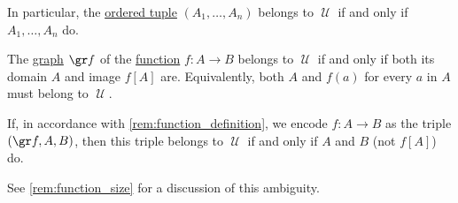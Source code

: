 \begin{proposition}
\begin{thmenum}
    In particular, the \hyperref[def:ordered_tuple]{ordered tuple} \( (A_1, \ldots, A_n) \) belongs to \( \mscrU \) if and only if \( A_1, \ldots, A_n \) do.

     The \hyperref[def:set_valued_function/graph]{graph} \( \gr f \) of the \hyperref[def:function]{function} \( f: A \to B \) belongs to \( \mscrU \) if and only if both its domain \( A \) and image \( f[A] \) are. Equivalently, both \( A \) and \( f(a) \) for every \( a \) in \( A \) must belong to \( \mscrU \).

    If, in accordance with \cref{rem:function_definition}, we encode \( f: A \to B \) as the triple \( (\gr f, A, B) \), then this triple belongs to \( \mscrU \) if and only if \( A \) and \( B \) (not \( f[A] \)) do.

    See \cref{rem:function_size} for a discussion of this ambiguity.
  \end{thmenum}
\end{proposition}
